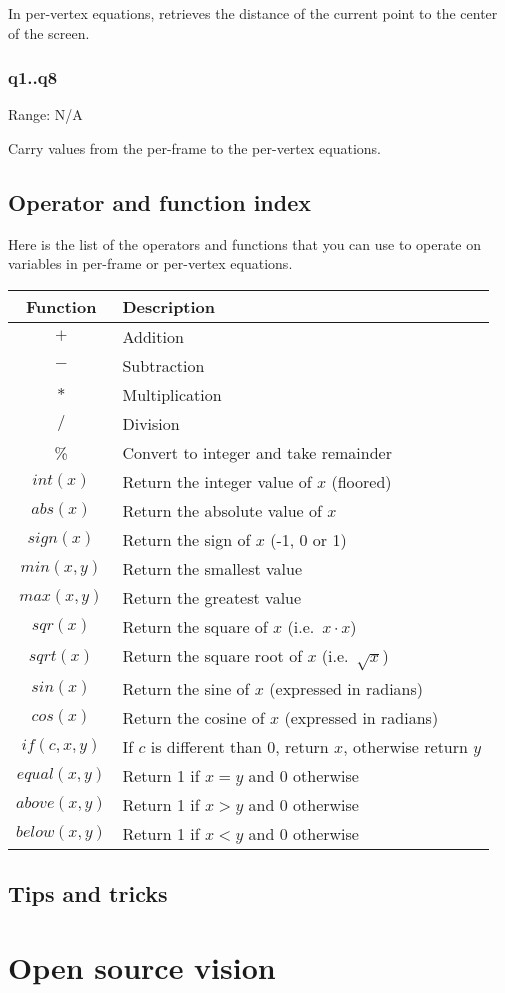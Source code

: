 \documentclass[11pt, a5paper, pagesize]{scrbook}
\begin{document}
In per-vertex equations, retrieves the distance of the current point to the center of the screen.

\subsection{q1..q8}
Range: N/A

Carry values from the per-frame to the per-vertex equations.

\section{Operator and function index}
Here is the list of the operators and functions that you can use to operate on variables in per-frame or per-vertex equations.

\begin{tabularx}{\textwidth}{|c|X|}
\hline
\textbf{Function} & \textbf{Description} \\
\hline
$+$ & Addition \\
\hline
$-$ & Subtraction \\
\hline
$*$ & Multiplication \\
\hline
$/$ & Division \\
\hline
\% & Convert to integer and take remainder\\
\hline
$int(x)$ & Return the integer value of $x$ (floored) \\
\hline
$abs(x)$ & Return the absolute value of $x$ \\
\hline
$sign(x)$ & Return the sign of $x$ (-1, 0 or 1) \\
\hline
$min(x,y)$ & Return the smallest value \\
\hline
$max(x,y)$ & Return the greatest value \\
\hline
$sqr(x)$ & Return the square of $x$ (i.e.\ $x \cdot x$) \\
\hline
$sqrt(x)$ & Return the square root of $x$ (i.e.\ $\sqrt{x}$) \\
\hline
$sin(x)$ & Return the sine of $x$ (expressed in radians) \\
\hline
$cos(x)$ & Return the cosine of $x$ (expressed in radians) \\
\hline
$if(c,x,y)$ & If $c$ is different than 0, return $x$, otherwise return $y$ \\
\hline
$equal(x,y)$ & Return 1 if $x = y$ and 0 otherwise \\
\hline
$above(x,y)$ & Return 1 if $x > y$ and 0 otherwise \\
\hline
$below(x,y)$ & Return 1 if $x < y$ and 0 otherwise \\
\hline
\end{tabularx}

\section{Tips and tricks}

\chapter{Open source vision}
\end{document}
